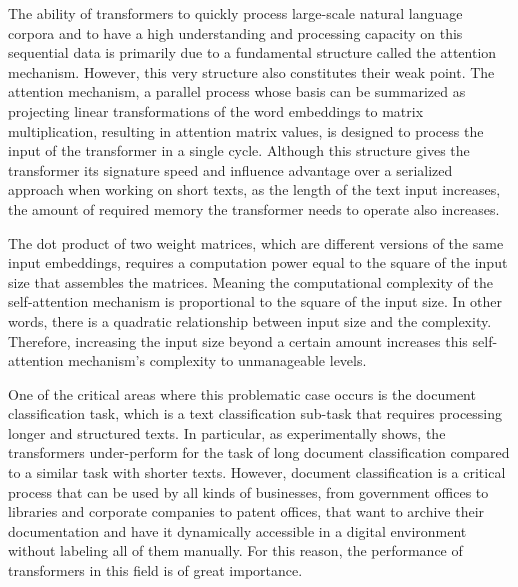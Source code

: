 \documentclass{iyte}
\begin{document}
The ability of transformers to quickly process large-scale natural language corpora and to have a high understanding and processing capacity on this sequential data is primarily due to a fundamental structure called the attention mechanism. However, this very structure also constitutes their weak point. The attention mechanism, a parallel process whose basis can be summarized as projecting linear transformations of the word embeddings to matrix multiplication, resulting in attention matrix values, is designed to process the input of the transformer in a single cycle. Although this structure gives the transformer its signature speed and influence advantage over a serialized approach when working on short texts, as the length of the text input increases, the amount of required memory the transformer needs to operate also increases.

The dot product of two weight matrices, which are different versions of the same input embeddings, requires a computation power equal to the square of the input size that assembles the matrices. Meaning the computational complexity of the self-attention mechanism is proportional to the square of the input size. In other words, there is a quadratic relationship between input size and the complexity. Therefore, increasing the input size beyond a certain amount increases this self-attention mechanism's complexity to unmanageable levels.

One of the critical areas where this problematic case occurs is the document classification task, which is a text classification sub-task that requires processing longer and structured texts. In particular, as \cite{ETC} experimentally shows, the transformers under-perform for the task of long document classification compared to a similar task with shorter texts. However, document classification is a critical process that can be used by all kinds of businesses, from government offices to libraries and corporate companies to patent offices, that want to archive their documentation and have it dynamically accessible in a digital environment without labeling all of them manually. For this reason, the performance of transformers in this field is of great importance.
\end{document}
